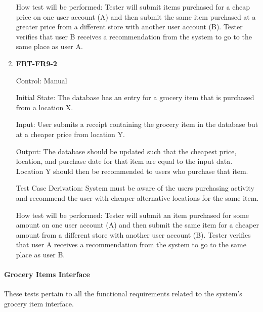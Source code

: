 \documentclass[12pt, titlepage]{article}
\begin{document}
\begin{enumerate}
How test will be performed: Tester will submit items purchased for a cheap price on one user account (A) and then submit the same item purchased at a greater price from a different store with another user account (B). Tester verifies that user B receives a recommendation from the system to go to the same place as user A.

\item{\textbf{FRT-FR9-2}}

Control: Manual
          
Initial State: The database has an entry for a grocery item that is purchased from a location X.

Input: User submits a receipt containing the grocery item in the database but at a cheaper price from location Y.
          
Output: The database should be updated such that the cheapest price, location, and purchase date for that item are equal to the input data. Location Y should then be recommended to users who purchase that item.

Test Case Derivation: System must be aware of the users purchasing activity and recommend the user with cheaper alternative locations for
the same item.
          
How test will be performed: Tester will submit an item purchased for some amount on one user account (A) and then submit the same item for a cheaper amount from a different store with another user account (B). Tester verifies that user A receives a recommendation from the system to go to the same place as user B.

\end{enumerate}

\paragraph{Grocery Items Interface}

These tests pertain to all the functional requirements related to the system's grocery item interface.
\end{document}
